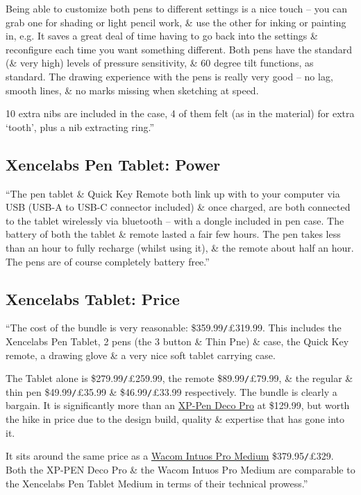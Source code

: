 \documentclass[oneside]{book}
\numberwithin{equation}{section}
\begin{document}
Being able to customize both pens to different settings is a nice touch -- you can grab one for shading or light pencil work, \& use the other for inking or painting in, e.g. It saves a great deal of time having to go back into the settings \& reconfigure each time you want something different. Both pens have the standard (\& very high) levels of pressure sensitivity, \& 60 degree tilt functions, as standard. The drawing experience with the pens is really very good -- no lag, smooth lines, \& no marks missing when sketching at speed.

10 extra nibs are included in the case, 4 of them felt (as in the material) for extra `tooth', plus a nib extracting ring.''

\subsection{Xencelabs Pen Tablet: Power}
``The pen tablet \& Quick Key Remote both link up with to your computer via USB (USB-A to USB-C connector included) \& once charged, are both connected to the tablet wirelessly via bluetooth -- with a dongle included in pen case. The battery of both the tablet \& remote lasted a fair few hours. The pen takes less than an hour to fully recharge (whilst using it), \& the remote about half an hour. The pens are of course completely battery free.''

\subsection{Xencelabs Tablet: Price}
``The cost of the bundle is very reasonable: \$359.99\texttt{/}\pounds319.99. This includes the Xencelabs Pen Tablet, 2 pens (the 3 button \& Thin Pne) \& case, the Quick Key remote, a drawing glove \& a very nice soft tablet carrying case.

The Tablet alone is \$279.99\texttt{/}\pounds259.99, the remote \$89.99\texttt{/}\pounds79.99, \& the regular \& thin pen \$49.99\texttt{/}\pounds35.99 \& \$46.99\texttt{/}\pounds33.99 respectively. The bundle is clearly a bargain. It is significantly more than an \href{https://www.creativebloq.com/reviews/xp-pen-deco-pro}{XP-Pen Deco Pro} at \$129.99, but worth the hike in price due to the design build, quality \& expertise that has gone into it.

It sits around the same price as a \href{https://www.creativebloq.com/reviews/wacom-intuos-pro-review}{Wacom Intuos Pro Medium} \$379.95\texttt{/}\pounds329. Both the XP-PEN Deco Pro \& the Wacom Intuos Pro Medium are comparable to the Xencelabs Pen Tablet Medium in terms of their technical prowess.''
\end{document}
